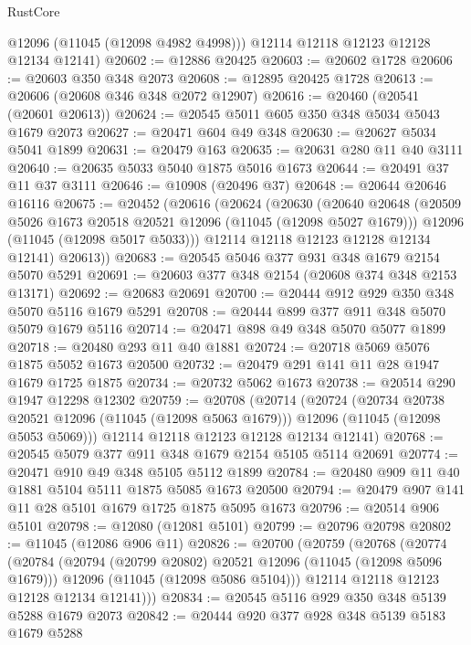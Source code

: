 \begin{lexlean}{RustCore}
\begin{coremodule}
        @12096
        (@11045 (@12098 @4982 @4998)))
      @12114
      @12118
      @12123
      @12128
      @12134
      @12141)
@20602 := @12886 @20425
@20603 := @20602 @1728
@20606 := @20603 @350 @348 @2073
@20608 := @12895 @20425 @1728
@20613 := @20606 (@20608 @346 @348 @2072 @12907)
@20616 := @20460 (@20541 (@20601 @20613))
@20624 := @20545 @5011 @605 @350 @348 @5034 @5043 @1679 @2073
@20627 := @20471 @604 @49 @348
@20630 := @20627 @5034 @5041 @1899
@20631 := @20479 @163
@20635 := @20631 @280 @11 @40 @3111
@20640 := @20635 @5033 @5040 @1875 @5016 @1673
@20644 := @20491 @37 @11 @37 @3111
@20646 := @10908 (@20496 @37)
@20648 := @20644 @20646 @16116
@20675 := @20452
    (@20616
      (@20624
        (@20630
          (@20640
            @20648
            (@20509 @5026 @1673 @20518 @20521 @12096 (@11045 (@12098 @5027 @1679)))
            @12096
            (@11045 (@12098 @5017 @5033)))
          @12114
          @12118
          @12123
          @12128
          @12134
          @12141)
        @20613))
@20683 := @20545 @5046 @377 @931 @348 @1679 @2154 @5070 @5291
@20691 := @20603 @377 @348 @2154 (@20608 @374 @348 @2153 @13171)
@20692 := @20683 @20691
@20700 := @20444 @912 @929 @350 @348 @5070 @5116 @1679 @5291
@20708 := @20444 @899 @377 @911 @348 @5070 @5079 @1679 @5116
@20714 := @20471 @898 @49 @348 @5070 @5077 @1899
@20718 := @20480 @293 @11 @40 @1881
@20724 := @20718 @5069 @5076 @1875 @5052 @1673 @20500
@20732 := @20479 @291 @141 @11 @28 @1947 @1679 @1725 @1875
@20734 := @20732 @5062 @1673
@20738 := @20514 @290 @1947 @12298 @12302
@20759 := @20708
    (@20714
      (@20724
        (@20734 @20738 @20521 @12096 (@11045 (@12098 @5063 @1679)))
        @12096
        (@11045 (@12098 @5053 @5069)))
      @12114
      @12118
      @12123
      @12128
      @12134
      @12141)
@20768 := @20545 @5079 @377 @911 @348 @1679 @2154 @5105 @5114 @20691
@20774 := @20471 @910 @49 @348 @5105 @5112 @1899
@20784 := @20480 @909 @11 @40 @1881 @5104 @5111 @1875 @5085 @1673 @20500
@20794 := @20479 @907 @141 @11 @28 @5101 @1679 @1725 @1875 @5095 @1673
@20796 := @20514 @906 @5101
@20798 := @12080 (@12081 @5101)
@20799 := @20796 @20798
@20802 := @11045 (@12086 @906 @11)
@20826 := @20700
    (@20759
      (@20768
        (@20774
          (@20784
            (@20794 (@20799 @20802) @20521 @12096 (@11045 (@12098 @5096 @1679)))
            @12096
            (@11045 (@12098 @5086 @5104)))
          @12114
          @12118
          @12123
          @12128
          @12134
          @12141)))
@20834 := @20545 @5116 @929 @350 @348 @5139 @5288 @1679 @2073
@20842 := @20444 @920 @377 @928 @348 @5139 @5183 @1679 @5288

\end{coremodule}
\end{lexlean}
